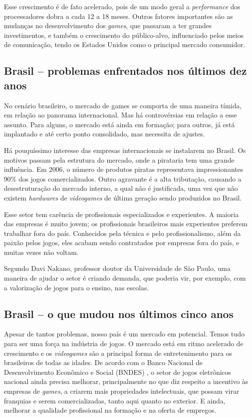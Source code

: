 Esse crescimento é de fato acelerado, pois de um modo geral a \textit{performance} dos processadores dobra a cada 12 a 18 meses. Outros fatores importantes são as mudanças no desenvolvimento dos \textit{games}, que passaram a ter grandes investimentos, e também o crescimento do público-alvo, influenciado pelos meios de comunicação, tendo os Estados Unidos como o principal mercado consumidor.
%
%
\subsection{Brasil -- problemas enfrentados nos últimos dez anos}
%
No cenário brasileiro, o mercado de games se comporta de uma maneira tímida, em relação ao panorama internacional. Mas há controvérsias em relação a esse assunto. Para alguns, o mercado está ainda em formação; para outros, já está implantado e até certo ponto consolidado, mas necessita de ajustes.

Há pouquíssimo interesse das empresas internacionais se instalarem no Brasil. Os motivos passam pela estrutura do mercado, onde a pirataria tem uma grande influência. Em 2006, o número de produtos piratas representava impressionantes 90\% \cite{GEDIGames} dos jogos comercializados. Outro agravante é a alta tributação, causando a desestruturação do mercado interno, a qual não é justificada, uma vez que não existem \textit{hardwares} de \textit{videogames} de última geração sendo produzidos no Brasil.

Esse setor tem carência de profissionais especializados e experientes. A maioria das empresas é muito jovem; os profissionais brasileiros mais experientes preferem trabalhar fora do país. Conhecidos pela técnica e pelo profissionalismo, além da paixão pelos jogos, eles acabam sendo contratados por empresas fora do país, e muitas vezes não voltam.

Segundo Davi Nakano, professor doutor da Universidade de São Paulo, uma maneira de ajudar o setor é criando demanda, que poderia vir, por exemplo, com a valorização de jogos para o ensino, nas escolas.
%
\subsection{Brasil -- o que mudou nos últimos cinco anos}
%
Apesar de tantos problemas, nosso país é um mercado em potencial. Temos tudo para ser uma força na indústria de jogos. O mercado está em ritmo acelerado de crescimento e os \textit{videogames} são a principal forma de entretenimento para os brasileiros de todas as idades. De acordo com o Banco Nacional de Desenvolvimento Econômico e Social (BNDES) \cite{GEDIGames}, o setor de jogos eletrônicos nacional ainda precisa melhorar, principalmente no que diz respeito a incentivo às empresas de \textit{games}, a criarem mais propriedades intelectuais, que possam virar franquias e serem comercializadas, tanto aqui quanto no exterior. E ainda, melhorar a qualidade profissional na formação e na oferta de empregos.

